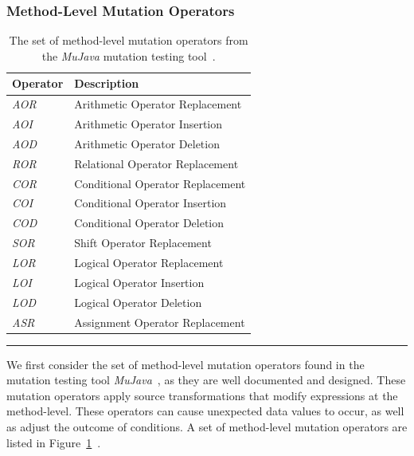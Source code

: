 \subsubsection{Method-Level Mutation Operators}
\label{subsubsec:background_method_operators}
\begin{table}[!tb]
  \centering
  \begin{tabular}{|l|l|}
    \hline
    \rowcolor[RGB]{169,196,223}
    \textbf{Operator} & \textbf{Description} \\
    \hline \emph{AOR} & Arithmetic Operator Replacement \\
    \hline \emph{AOI} & Arithmetic Operator Insertion \\
    \hline \emph{AOD} & Arithmetic Operator Deletion \\
    \hline \emph{ROR} & Relational Operator Replacement \\
    \hline \emph{COR} & Conditional Operator Replacement \\
    \hline \emph{COI} & Conditional Operator Insertion \\
    \hline \emph{COD} & Conditional Operator Deletion \\
    \hline \emph{SOR} & Shift Operator Replacement \\
    \hline \emph{LOR} & Logical Operator Replacement \\
    \hline \emph{LOI} & Logical Operator Insertion \\
    \hline \emph{LOD} & Logical Operator Deletion \\
    \hline \emph{ASR} & Assignment Operator Replacement \\
    \hline
  \end{tabular}
  \caption{The set of method-level mutation operators from the \emph{MuJava} mutation testing tool~\cite{MOK05, MO05a}.}
  \label{tab:method_operators}
  \vspace{2mm}
  \hrule
\end{table}

We first consider the set of method-level mutation operators found in the mutation testing tool \emph{MuJava}~\cite{MOK05}, as they are well documented and designed. These mutation operators apply source transformations that modify expressions at the method-level. These operators can cause unexpected data values to occur, as well as adjust the outcome of conditions. A set of method-level mutation operators are listed in Figure~\ref{tab:method_operators}~\cite{MO05a}.

